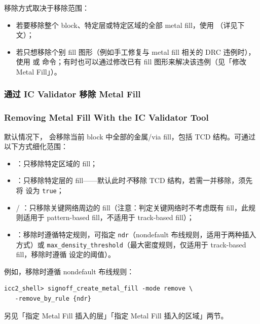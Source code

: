 移除方式取决于移除范围：
\begin{itemize}
  \item 若要移除整个 block、特定层或特定区域的全部 metal fill，使用 （详见下文）；
  \item 若只想移除个别 fill 图形（例如手工修复与 metal fill 相关的 DRC 违例时），使用  或  命令；有时也可以通过修改已有 fill 图形来解决该违例（见「修改 Metal Fill」）。
\end{itemize}

\subsubsection{通过 IC Validator 移除 Metal Fill}
\subsubsection*{Removing Metal Fill With the IC Validator Tool}

默认情况下， 会移除当前 block 中全部的金属/via fill，包括 TCD 结构。可通过以下方式细化范围：
\begin{itemize}
  \item {}：只移除特定区域的 fill；
  \item {}：只移除特定层的 fill——默认此时\emph{不}移除 TCD 结构，若需一并移除，须先将  设为 \texttt{true}；
  \item {} / ：只移除关键网络周边的 fill（注意：判定关键网络时不考虑既有 fill，此规则适用于 pattern-based fill，不适用于 track-based fill）；
  \item {}：移除时遵循特定规则，可指定 \texttt{ndr}（nondefault 布线规则，适用于两种插入方式）或 \texttt{max\_density\_threshold}（最大密度规则，仅适用于 track-based fill，移除时遵循  设定的阈值）。
\end{itemize}

例如，移除时遵循 nondefault 布线规则：

\begin{lstlisting}
icc2_shell> signoff_create_metal_fill -mode remove \
   -remove_by_rule {ndr}
\end{lstlisting}

\begin{seeAlsoBox}
另见「指定 Metal Fill 插入的层」「指定 Metal Fill 插入的区域」两节。
\end{seeAlsoBox}

